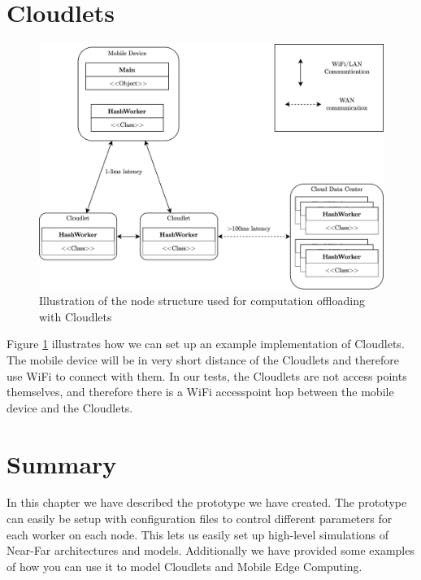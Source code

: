 \section{Cloudlets}
\begin{figure}[t]
    \centering
    \includegraphics[scale=0.9]{chapters/5_implementation/figures/Cloudlet_implementation.png}
    \caption{Illustration of the node structure used for computation offloading with Cloudlets}
    \label{fig:Cloudlet_implementation}
\end{figure}
Figure \ref{fig:Cloudlet_implementation} illustrates how we can set up an example implementation of Cloudlets. The mobile device will be in very short distance of the Cloudlets and therefore use WiFi to connect with them. In our tests, the Cloudlets are not access points themselves, and therefore there is a WiFi accesspoint hop between the mobile device and the Cloudlets.










\section{Summary}
In this chapter we have described the prototype we have created. The prototype can easily be setup with configuration files to control different parameters for each worker on each node. This lets us easily set up high-level simulations of Near-Far architectures and models. Additionally we have provided some examples of how you can use it to model Cloudlets and Mobile Edge Computing.